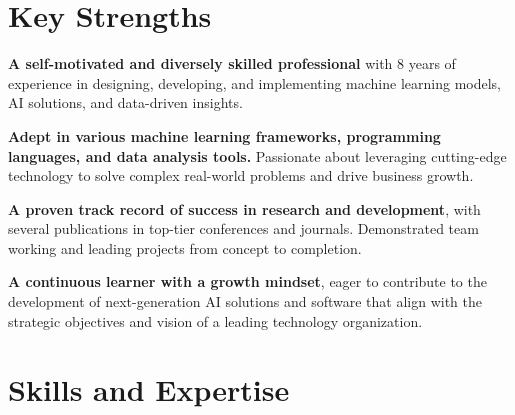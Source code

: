 \documentclass[11pt]{article}
\begin{document}
\maketitle

\section{Key Strengths}

\begin{outerlist}
		\item \textbf{A self-motivated and diversely skilled professional} with 8 years of experience in designing, developing, and implementing machine learning models, AI solutions, and data-driven insights.
    \item \textbf{Adept in various machine learning frameworks, programming languages, and data analysis tools.} Passionate about leveraging cutting-edge technology to solve complex real-world problems and drive business growth.
    \item \textbf{A proven track record of success in research and development}, with several publications in top-tier conferences and journals. Demonstrated team working and leading projects from concept to completion.
    \item \textbf{A continuous learner with a growth mindset}, eager to contribute to the development of next-generation AI solutions and software that align with the strategic objectives and vision of a leading technology organization.
\end{outerlist}


\section{Skills and Expertise}
\end{document}
